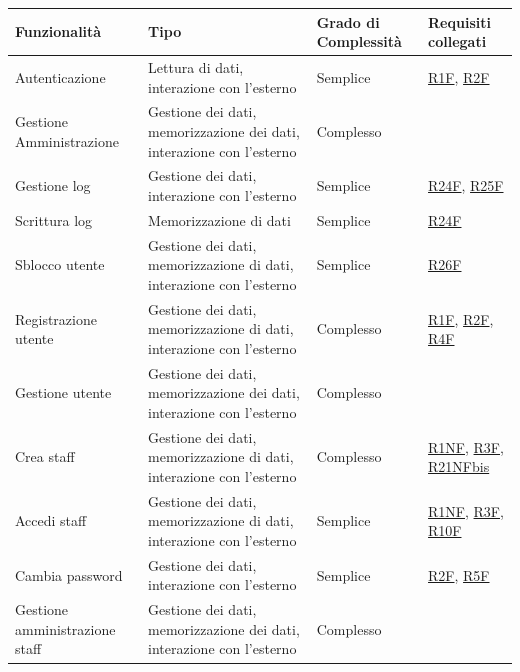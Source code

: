 \documentclass[a4paper]{article}
\begin{document}
\begin{center}
    \begin{tabularx}{1\textwidth}{|X|X|X|X|}
        \hline
        \textbf{Funzionalità} & \textbf{Tipo} & \textbf{Grado di Complessità} & \textbf{Requisiti collegati}\\
        \hline
        \hline
        Autenticazione & Lettura di dati, interazione con l'esterno & Semplice & \hyperlink{R1F}{R1F}, \hyperlink{R2F}{R2F} \\
        \hline
        Gestione Amministrazione & Gestione dei dati, memorizzazione dei dati, interazione con l'esterno & Complesso & \\
        \hline
        Gestione log & Gestione dei dati, interazione con l'esterno & Semplice & \hyperlink{R24F}{R24F}, \hyperlink{R25F}{R25F}\\
        \hline
        Scrittura log & Memorizzazione di dati & Semplice & \hyperlink{R24F}{R24F}\\
        \hline
        Sblocco utente & Gestione dei dati, memorizzazione di dati, interazione con l'esterno & Semplice & \hyperlink{R26F}{R26F}\\
        \hline
        Registrazione utente & Gestione dei dati, memorizzazione di dati, interazione con l'esterno & Complesso & \hyperlink{R1F}{R1F}, \hyperlink{R2F}{R2F}, \hyperlink{R4F}{R4F} \\
        \hline
        Gestione utente & Gestione dei dati, memorizzazione dei dati, interazione con l'esterno & Complesso & \\
        \hline
        Crea staff & Gestione dei dati, memorizzazione di dati, interazione con l'esterno & Complesso & \hyperlink{R1NF}{R1NF}, \hyperlink{R3F}{R3F}, \hyperlink{R21NFbis}{R21NFbis}\\
        \hline
        Accedi staff & Gestione dei dati, memorizzazione di dati, interazione con l'esterno & Semplice & \hyperlink{R1NF}{R1NF}, \hyperlink{R3F}{R3F}, \hyperlink{R10F}{R10F} \\
        \hline
        Cambia password & Gestione dei dati, interazione con l'esterno & Semplice & \hyperlink{R2F}{R2F}, \hyperlink{R5F}{R5F} \\
        \hline
        Gestione amministrazione staff & Gestione dei dati, memorizzazione dei dati, interazione con l'esterno & Complesso &  \\

\end{tabularx}
\end{center}
\end{document}
